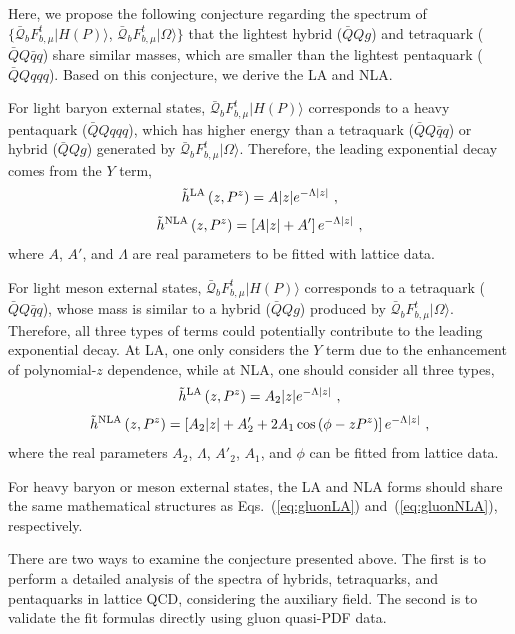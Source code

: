 \documentclass[a4paper,11pt]{article}
\begin{document}
Here, we propose the following conjecture regarding the spectrum of $\{\bar{\mathcal{Q}}_{b} F^{t}_{b,\mu} | H(P) \rangle$, $\bar{\mathcal{Q}}_{b} F^{t}_{b,\mu} | \Omega \rangle \}$ that the lightest hybrid ($\bar{Q}Q g$) and tetraquark ($\bar{Q}Q \bar{q}q$) share similar masses, which are smaller than the lightest pentaquark ($\bar{Q}Q qqq$). Based on this conjecture, we derive the LA and NLA. 

For light baryon external states, $\bar{\mathcal{Q}}_{b} F^{t}_{b,\mu} | H(P) \rangle$ corresponds to a heavy pentaquark ($\bar{Q}Q qqq$), which has higher energy than a tetraquark ($\bar{Q}Q \bar{q}q$) or hybrid ($\bar{Q}Q g$) generated by $\bar{\mathcal{Q}}_{b} F^{t}_{b,\mu} | \Omega \rangle$. Therefore, the leading exponential decay comes from the $Y$ term, 
\begin{align}\label{eq:gluonLA}
\tilde{h}^{\rm LA}\left(z,P^z\right) = 
A  |z| e^{-\Lambda |z|}  \ ,
\end{align}
\begin{align}\label{eq:gluonNLA}
\tilde{h}^{\rm NLA}\left(z,P^z\right) = 
\left[ A  |z| +  A'  \right] e^{-\Lambda |z|}  \ ,
\end{align}
where $A$, $A'$, and $\Lambda$ are real parameters to be fitted with lattice data. 

For light meson external states, $\bar{\mathcal{Q}}_{b} F^{t}_{b,\mu} | H(P) \rangle$ corresponds to a tetraquark ($\bar{Q}Q \bar{q}q$), whose mass is similar to a hybrid ($\bar{Q}Q g$) produced by $\bar{\mathcal{Q}}_{b} F^{t}_{b,\mu} | \Omega \rangle$. Therefore, all three types of terms could potentially contribute to the leading exponential decay. At LA, one only considers the $Y$ term due to the enhancement of polynomial-$z$ dependence, while at NLA, one should consider all three types, 
\begin{align}
\tilde{h}^{\rm LA}\left(z,P^z\right) = 
A_2 |z| e^{-\Lambda |z|}  \ ,
\end{align}
\begin{align}
\tilde{h}^{\rm NLA}\left(z,P^z\right) 
= \left[ A_{2} |z| + A'_2 + 2 A_1 \cos\left(\phi-z P^z\right) \right] e^{-\Lambda |z|} \ ,
\end{align} 
where the real parameters $A_2$, $\Lambda$, $A'_2$, $A_1$, and $\phi$ can be fitted from lattice data. 

For heavy baryon or meson external states, the LA and NLA forms should share the same mathematical structures as Eqs.~(\ref{eq:gluonLA}) and~(\ref{eq:gluonNLA}), respectively. 

There are two ways to examine the conjecture presented above. The first is to perform a detailed analysis of the spectra of hybrids, tetraquarks, and pentaquarks in lattice QCD, considering the auxiliary field. The second is to validate the fit formulas directly using gluon quasi-PDF data.






\end{document}
